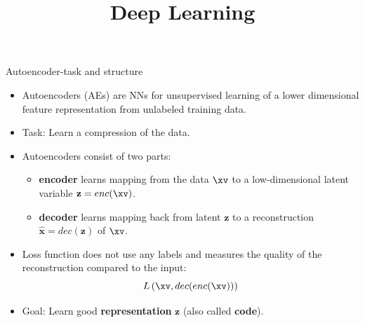 





\title{Deep Learning}
\date{}


\newcommand{\titlefigure}{plots/AE_undercomplete.png}
\newcommand{\learninggoals}{
  \item Task and structure of an AE
  \item Undercomplete AEs
  \item Relation of AEs and PCA
}



\begin{vbframe}{Autoencoder-task and structure}

  \begin{itemize}
  \item Autoencoders (AEs) are %
  NNs for unsupervised learning of a lower dimensional feature representation from unlabeled training data.
  \item Task: Learn a compression of the data. 
  \item Autoencoders consist of two parts:
  \begin{itemize}
            \item \textbf{encoder} learns mapping from the data $\xv$ to a low-dimensional latent variable $\mathbf{z} = enc(\xv)$.
            \item \textbf{decoder} learns mapping back from latent $\mathbf{z} $ to a reconstruction  $\hat {\mathbf{x}} = dec(\mathbf{z})$ of $\xv$.
  \end{itemize}
    \item Loss function does not use any labels and measures the quality of the reconstruction compared to the input: 
    $$
      L\left(\xv, dec(enc(\xv))\right)
    $$
    \item Goal: Learn good \textbf{representation} $\mathbf{z}$ (also called \textbf{code}).

  \end{itemize}
  
\end{vbframe}
